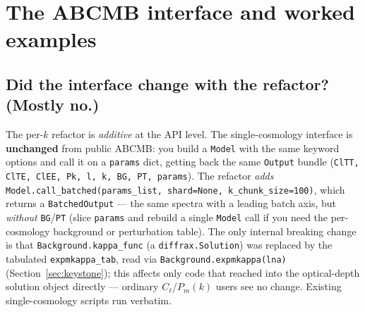 \documentclass[11pt]{article}
\newcommand{\code}[1]{\texttt{\small #1}}
\newcommand{\Cl}{C_\ell}
\begin{document}
\section{The \textsc{ABCMB} interface and worked examples}
\label{sec:interface}

\subsection{Did the interface change with the refactor? (Mostly no.)}
The per-$k$ refactor is \emph{additive} at the API level. The
single-cosmology interface is \textbf{unchanged} from public
\textsc{ABCMB}: you build a \code{Model} with the same keyword options and
call it on a \code{params} dict, getting back the same \code{Output} bundle
(\code{ClTT, ClTE, ClEE, Pk, l, k, BG, PT, params}). The refactor
\emph{adds} \code{Model.call\_batched(params\_list, shard=None,
k\_chunk\_size=100)}, which returns a \code{BatchedOutput} --- the same
spectra with a leading batch axis, but \emph{without} \code{BG}/\code{PT}
(slice \code{params} and rebuild a single \code{Model} call if you need the
per-cosmology background or perturbation table). The only internal breaking
change is that \code{Background.kappa\_func} (a \code{diffrax.Solution}) was
replaced by the tabulated \code{expmkappa\_tab}, read via
\code{Background.expmkappa(lna)} (Section~\ref{sec:keystone}); this affects
only code that reached into the optical-depth solution object directly ---
ordinary $\Cl$/$P_m(k)$ users see no change. Existing single-cosmology
scripts run verbatim.
\end{document}
